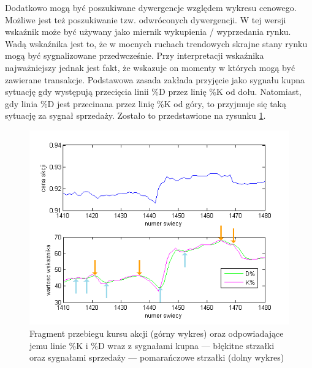 \documentclass[12pt,a4paper]{article}
\begin{document}
\noindent Dodatkowo mogą być poszukiwane dywergencje względem wykresu cenowego. Możliwe jest też poszukiwanie tzw. odwróconych dywergencji. W tej wersji wskaźnik może być używany jako miernik wykupienia / wyprzedania rynku. Wadą wskaźnika jest to, że w mocnych ruchach trendowych skrajne stany rynku mogą być sygnalizowane przedwcześnie.
Przy interpretacji wskaźnika najważniejszy jednak jest fakt, że wskazuje on momenty w których mogą być zawierane transakcje. Podstawowa zasada zakłada przyjęcie jako sygnału kupna sytuację gdy występują przecięcia linii \%D przez linię \%K od dołu. Natomiast, gdy linia \%D jest przecinana przez linię \%K od góry, to przyjmuje się taką sytuację za sygnał sprzedaży. Zostało to przedstawione na rysunku \ref{zasada}. \\
\begin{figure}[h!]
\centering
\includegraphics[width = \textwidth]{ss.png}
\caption{Fragment przebiegu kursu akcji (górny wykres) oraz odpowiadające jemu linie \%K i \%D wraz z sygnałami kupna --- błękitne strzałki oraz sygnałami sprzedaży --- pomarańczowe strzałki (dolny wykres)}
\label{zasada}
\end{figure}
\FloatBarrier
\end{document}
